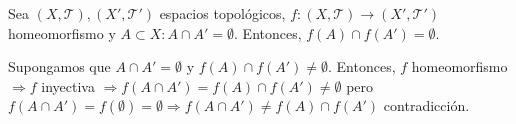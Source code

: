 \begin{ejr}[31]
  Sea $( X, \mathcal{T} ), ( X', \mathcal{T}' )$ espacios topológicos, $f : ( X, \mathcal{T} ) \to ( X', \mathcal{T}' )$ homeomorfismo y $A \subset X : A \cap A' = \emptyset$. Entonces, $f(A) \cap f(A') = \emptyset$.
\end{ejr}



\begin{sol}
  Supongamos que $A \cap A' = \emptyset$ y $f(A) \cap f(A') \neq \emptyset$. Entonces, $f$ homeomorfismo $\Rightarrow f$ inyectiva $\Rightarrow f(A \cap A') = f(A) \cap f(A') \neq \emptyset$ pero $f(A \cap A') = f(\emptyset) = \emptyset \Rightarrow f(A \cap A') \neq f(A) \cap f(A')$  contradicción.
\end{sol}
